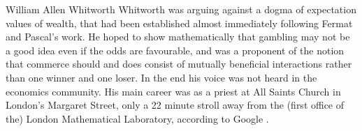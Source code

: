 \begin{history}{William Allen Whitworth}
Whitworth was arguing against a dogma of expectation values of wealth, that had 
been established almost immediately following Fermat and Pascal's work. He 
hoped to show mathematically that gambling may not be a good idea even if 
the odds are favourable, and was a 
proponent of the notion that commerce should and does
consist of mutually beneficial interactions rather than one winner and one loser. 
In the end his voice was not heard in the economics community. His main career was as a priest at All Saints Church in London's Margaret Street, only a 22 minute stroll away from the (first office of the) London 
Mathematical Laboratory, according to Google .
%
%
\end{history}
